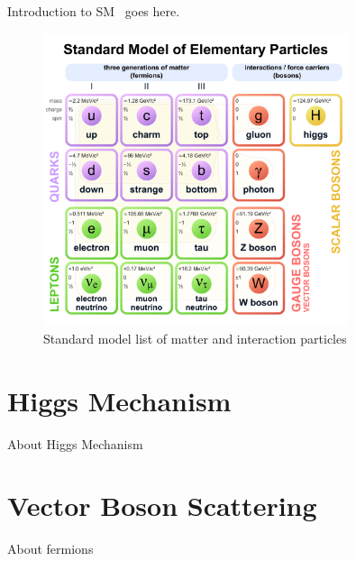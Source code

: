 Introduction to \gls{SM}~\cite{Yang-Mill:1954} goes here.

\begin{figure}[!ht]
    \centering
    \includegraphics[width=0.8\textwidth]{figures/Standard_Model_of_Elementary_Particles.pdf}
    \caption[Standard model list of matter and interaction particles]%
    {Standard model list of matter and interaction particles~\cite{image-standard-model}}%
    \label{fig:standard-model-details}
\end{figure}


\section{Higgs Mechanism}

About Higgs Mechanism

\section{Vector Boson Scattering}

About fermions